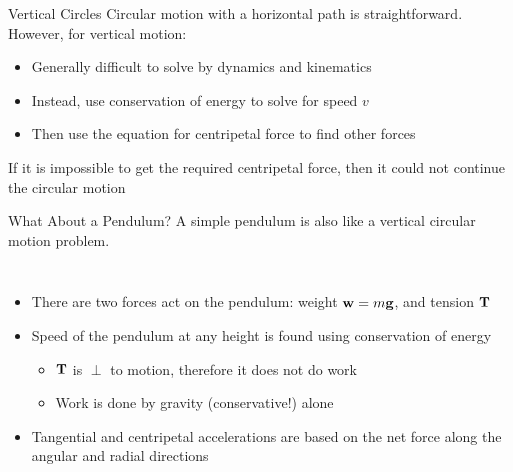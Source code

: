 \documentclass[12pt,compress,aspectratio=169]{beamer}
\newcommand{\mb}[1]{\ensuremath\mathbf{#1}}
\begin{document}
\begin{frame}{Vertical Circles}
  Circular motion with a horizontal path is straightforward. However, for
  vertical motion:
  \begin{itemize}
  \item Generally difficult to solve by dynamics and kinematics
  \item Instead, use conservation of energy to solve for speed $v$
  \item Then use the equation for centripetal force to find other forces
  \end{itemize}
  If it is impossible to get the required centripetal force, then it could not
  continue the circular motion
\end{frame}



\begin{frame}{What About a Pendulum?}
  A simple pendulum is also like a vertical circular motion problem.

  \vspace{.1in}\begin{columns}

    \begin{itemize}
    \item There are two forces act on the pendulum: weight $\mb{w}=m\mb{g}$, and
    tension $\mb{T}$
    \item Speed of the pendulum at any height is found using conservation
      of energy
      \begin{itemize}
      \item $\mb{T}$ is $\perp$ to motion, therefore it does not do work
      \item Work is done by gravity (conservative!) alone
      \end{itemize}
    \item Tangential and centripetal accelerations are based on the net force
      along the angular and radial directions
    \end{itemize}
  \end{columns}
\end{frame}
\end{document}
